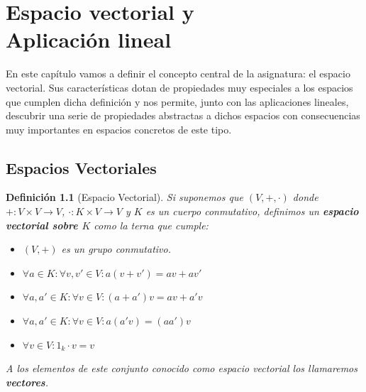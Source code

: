 \documentclass[10pt,a4paper,openright]{book}
\theoremstyle{break}
\newtheorem*{defi}{Definición}
\begin{document}
\mainmatter
\hypersetup{linkcolor=black} %
\setcounter{tocdepth}{3}%
\setcounter{secnumdepth}{4}%
\tableofcontents
\hypersetup{linkcolor=blue} %

\chapter{Espacio vectorial y \\ Aplicación lineal}
En este capítulo vamos a definir el concepto central de la asignatura: el espacio vectorial. Sus características dotan de propiedades muy especiales a los espacios que cumplen dicha definición y nos permite, junto con las aplicaciones lineales, descubrir una serie de propiedades abstractas a dichos espacios con consecuencias muy importantes en espacios concretos de este tipo.

\section{Espacios Vectoriales}
\begin{defi}[Espacio Vectorial]
Si suponemos que $(V,+,\cdot)$ donde $+: V\times V\rightarrow V$, $\cdot : K\times V\rightarrow V$ y $K$ es un cuerpo conmutativo, definimos un \textbf{espacio vectorial sobre $K$} como la terna que cumple:
\begin{itemize}
\item $(V,+)$ es un grupo conmutativo.

\item $\forall a \in K: \forall v,v'\in V: a(v+v')=av+av'$

\item $\forall a,a' \in K: \forall v\in V: (a+a')v=av+a'v$

\item $\forall a,a'\in K: \forall v \in V: a(a'v)=(aa')v$

\item $\forall v\in V: 1_k\cdot v=v$
\end{itemize}
A los elementos de este conjunto conocido como espacio vectorial los llamaremos \textbf{vectores}.
\end{defi}
\end{document}

